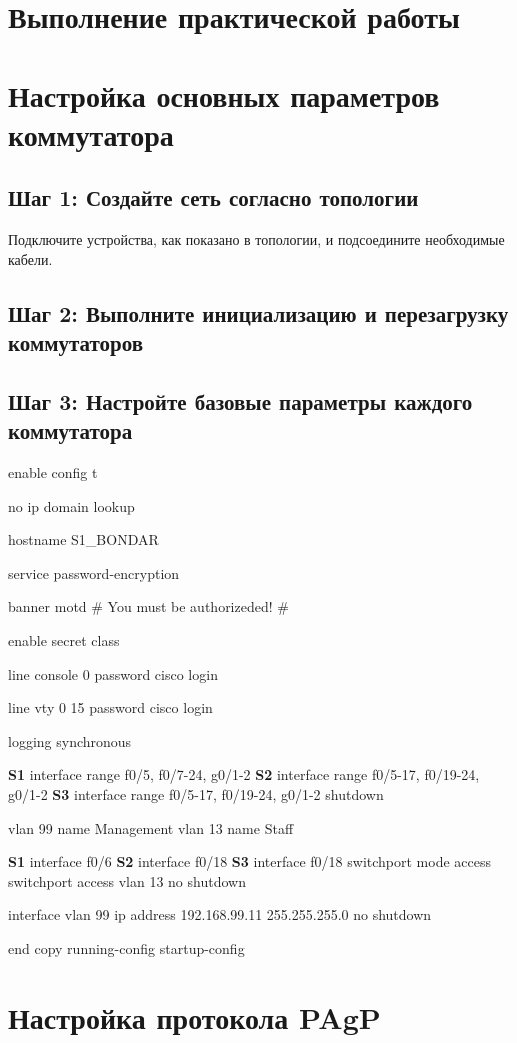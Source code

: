 \section{Выполнение практической работы}

\section{Настройка основных параметров коммутатора}
\subsection{Шаг 1: Создайте сеть согласно топологии}
Подключите устройства, как показано в топологии, и подсоедините необходимые кабели.
\subsection{Шаг 2: Выполните инициализацию и перезагрузку коммутаторов}

\subsection{Шаг 3: Настройте базовые параметры каждого коммутатора}


enable
config t

no ip domain lookup

hostname S1_BONDAR

service password-encryption

banner motd # You must be authorizeded! #

enable secret class

line console 0
password cisco
login

line vty 0 15
password cisco
login

logging synchronous

\textbf{S1} interface range f0/5, f0/7-24, g0/1-2
\textbf{S2} interface range f0/5-17, f0/19-24, g0/1-2
\textbf{S3} interface range f0/5-17, f0/19-24, g0/1-2
shutdown

vlan 99
name Management
vlan 13
name Staff

\textbf{S1} interface f0/6
\textbf{S2} interface f0/18
\textbf{S3} interface f0/18
switchport mode access
switchport access vlan 13
no shutdown

interface vlan 99
ip address 192.168.99.11 255.255.255.0
no shutdown


end
copy running-config startup-config

\section{Настройка протокола PAgP}
